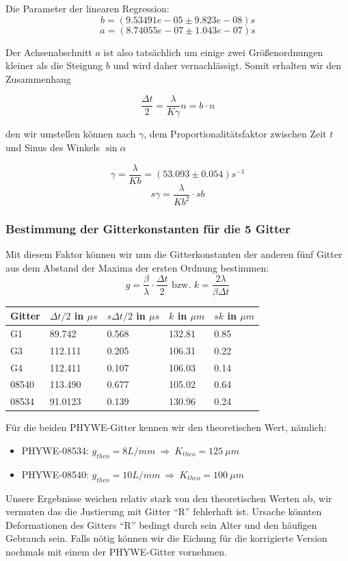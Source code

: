 Die Parameter der linearen Regression:
$$ b               = (9.53491e-05      \pm 9.823e-08) s $$
$$ a               = (8.74055e-07      \pm 1.043e-07) s $$

Der Achsenabschnitt $a$ ist also tatsächlich um einige zwei Größenordnungen kleiner als die Steigung $b$ und wird daher vernachlässigt. Somit erhalten wir den Zusammenhang

$$\frac{\Delta t}{2} = \frac{\lambda}{K\gamma}n = b\cdot n$$

den wir umstellen können nach $\gamma$, dem Proportionalitätsfaktor zwischen Zeit $t$ und Sinus des Winkels $\sin \alpha$ 

$$ \gamma = \frac{\lambda}{Kb} = (53.093 \pm 0.054) s^{-1} $$
$$s\gamma = \frac{\lambda}{Kb^2} \cdot sb $$


\subsubsection{Bestimmung der Gitterkonstanten f\"ur die 5 Gitter}

Mit diesem Faktor können wir nun die Gitterkonstanten der anderen fünf Gitter aus dem Abstand der Maxima der ersten Ordnung bestimmen:
$$ g = \frac{\beta}{\lambda}\cdot \frac{\Delta t}{2} \text{ bzw. } k = \frac{2 \lambda }{\beta \Delta t} $$
\begin{center}
\begin{tabular}{lllll}
\toprule 
Gitter & $\Delta t /2$ in $\mu s$ & $s\Delta t /2$ in $\mu s$ & $k$ in $\mu m$ & $sk$ in $\mu m$\\
\midrule
G1 & 89.742 & 0.568 & 132.81 & 0.85\\
G3 & 112.111 & 0.205 & 106.31 & 0.22\\
G4 & 112.411 & 0.107 & 106.03 & 0.14\\
08540 & 113.490 & 0.677 & 105.02 & 0.64\\
08534 & 91.0123 & 0.139 & 130.96 & 0.24\\
\bottomrule
\end{tabular} 
\end{center}

F\"ur die beiden PHYWE-Gitter kennen wir den theoretischen Wert, n\"amlich: 
\begin{itemize}
\item PHYWE-08534: $g_{theo} = 8 L/mm\ \Rightarrow \ K_{theo} = 125 \ \mu m$
\item PHYWE-08540: $g_{theo} = 10 L/mm\ \Rightarrow \ K_{theo} = 100 \ \mu m$
\end{itemize} 
Unsere Ergebnisse weichen relativ stark von den theoretischen Werten ab, wir vermuten das die Justierung mit Gitter ``R'' fehlerhaft ist. Ursache könnten Deformationen des Gitters ``R'' bedingt durch sein Alter und den häufigen Gebrauch sein. Falls nötig können wir die Eichung für die korrigierte Version nochmals mit einem der PHYWE-Gitter vornehmen.

